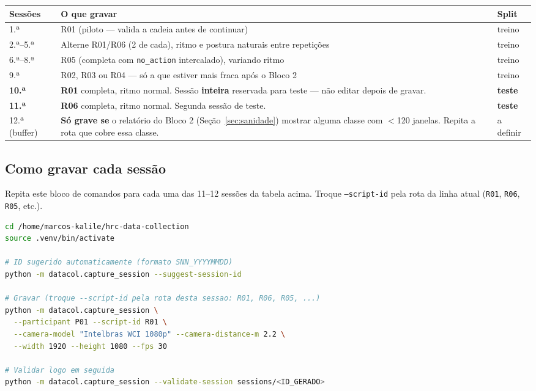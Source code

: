 \documentclass[11pt,a4paper]{article}
\begin{document}
\begin{center}
\begin{tabular}{@{}p{2.5cm}p{9cm}p{2cm}@{}}
\toprule
\textbf{Sessões} & \textbf{O que gravar} & \textbf{Split} \\
\midrule
1.ª & R01 (piloto --- valida a cadeia antes de continuar) & treino \\
2.ª--5.ª & Alterne R01/R06 (2 de cada), ritmo e postura naturais entre repetições & treino \\
6.ª--8.ª & R05 (completa com \texttt{no\_action} intercalado), variando ritmo & treino \\
9.ª & R02, R03 ou R04 --- só a que estiver mais fraca após o Bloco 2 & treino \\
\textbf{10.ª} & \textbf{R01} completa, ritmo normal. Sessão \textbf{inteira} reservada para teste --- não editar depois de gravar. & \textbf{teste} \\
\textbf{11.ª} & \textbf{R06} completa, ritmo normal. Segunda sessão de teste. & \textbf{teste} \\
12.ª (buffer) & \textbf{Só grave se} o relatório do Bloco 2 (Seção~\ref{sec:sanidade}) mostrar alguma classe com $<$120 janelas. Repita a rota que cobre essa classe. & a definir \\
\bottomrule
\end{tabular}
\end{center}

\subsection{Como gravar cada sessão}

Repita este bloco de comandos para cada uma das 11--12 sessões da tabela
acima. Troque \texttt{--script-id} pela rota da linha atual (\texttt{R01},
\texttt{R06}, \texttt{R05}, etc.).

\begin{lstlisting}[language=bash]
cd /home/marcos-kalile/hrc-data-collection
source .venv/bin/activate

# ID sugerido automaticamente (formato SNN_YYYYMMDD)
python -m datacol.capture_session --suggest-session-id

# Gravar (troque --script-id pela rota desta sessao: R01, R06, R05, ...)
python -m datacol.capture_session \
  --participant P01 --script-id R01 \
  --camera-model "Intelbras WCI 1080p" --camera-distance-m 2.2 \
  --width 1920 --height 1080 --fps 30

# Validar logo em seguida
python -m datacol.capture_session --validate-session sessions/<ID_GERADO>
\end{lstlisting}
\end{document}

